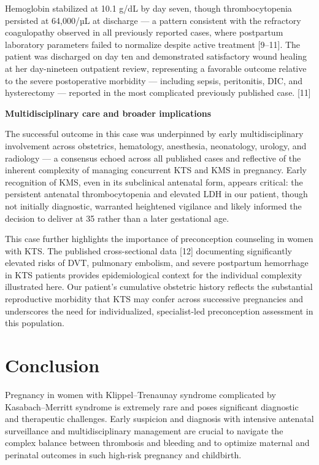 \documentclass[
  letterpaper,
  DIV=11,
  numbers=noendperiod]{scrartcl}
\begin{document}
Hemoglobin stabilized at 10.1 g/dL by day seven, though thrombocytopenia
persisted at 64,000/µL at discharge --- a pattern consistent with the
refractory coagulopathy observed in all previously reported cases, where
postpartum laboratory parameters failed to normalize despite active
treatment {[}9--11{]}. The patient was discharged on day ten and
demonstrated satisfactory wound healing at her day-nineteen outpatient
review, representing a favorable outcome relative to the severe
postoperative morbidity --- including sepsis, peritonitis, DIC, and
hysterectomy --- reported in the most complicated previously published
case. {[}11{]}

\textbf{Multidisciplinary care and broader implications}

The successful outcome in this case was underpinned by early
multidisciplinary involvement across obstetrics, hematology, anesthesia,
neonatology, urology, and radiology --- a consensus echoed across all
published cases and reflective of the inherent complexity of managing
concurrent KTS and KMS in pregnancy. Early recognition of KMS, even in
its subclinical antenatal form, appears critical: the persistent
antenatal thrombocytopenia and elevated LDH in our patient, though not
initially diagnostic, warranted heightened vigilance and likely informed
the decision to deliver at 35 rather than a later gestational age.

This case further highlights the importance of preconception counseling
in women with KTS. The published cross-sectional data {[}12{]}
documenting significantly elevated risks of DVT, pulmonary embolism, and
severe postpartum hemorrhage in KTS patients provides epidemiological
context for the individual complexity illustrated here. Our patient's
cumulative obstetric history reflects the substantial reproductive
morbidity that KTS may confer across successive pregnancies and
underscores the need for individualized, specialist-led preconception
assessment in this population.

\section{Conclusion}\label{conclusion}

Pregnancy in women with Klippel--Trenaunay syndrome complicated by
Kasabach--Merritt syndrome is extremely rare and poses significant
diagnostic and therapeutic challenges. Early suspicion and diagnosis
with intensive antenatal surveillance and multidisciplinary management
are crucial to navigate the complex balance between thrombosis and
bleeding and to optimize maternal and perinatal outcomes in such
high-risk pregnancy and childbirth.
\end{document}
